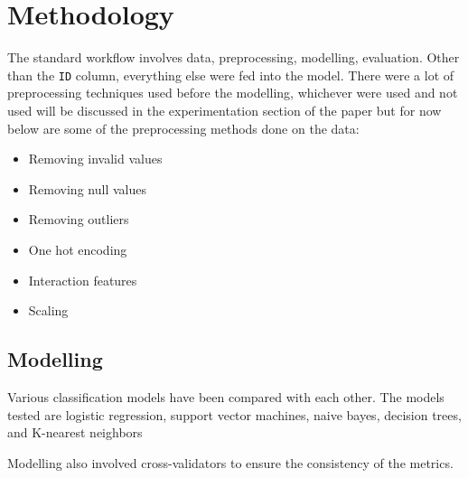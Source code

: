 \section{Methodology}


The standard workflow involves data, preprocessing, modelling, evaluation. Other than the \texttt{ID} column, everything else were fed into the model. There were a lot of preprocessing techniques used before the modelling, whichever were used and not used will be discussed in the experimentation section of the paper but for now below are some of the preprocessing methods done on the data:

\begin{itemize}
\item Removing invalid values
\item Removing null values
\item Removing outliers
\item One hot encoding
\item Interaction features
\item Scaling
\end{itemize}

\subsection{Modelling}

Various classification models have been compared with each other. The models tested are logistic regression, support vector machines, naive bayes, decision trees, and K-nearest neighbors

Modelling also involved cross-validators to ensure the consistency of the metrics.
